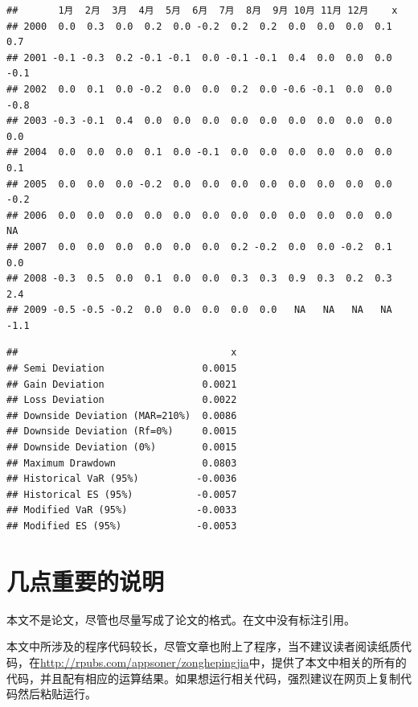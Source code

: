 \documentclass{article}\usepackage[]{graphicx}\usepackage[]{color}
\makeatletter
\newenvironment{kframe}{%
 \def\at@end@of@kframe{}%
 \ifinner\ifhmode%
  \def\at@end@of@kframe{\end{minipage}}%
  \begin{minipage}{\columnwidth}%
 \fi\fi%
 \def\FrameCommand##1{\hskip\@totalleftmargin \hskip-\fboxsep
 \colorbox{shadecolor}{##1}\hskip-\fboxsep
     \hskip-\linewidth \hskip-\@totalleftmargin \hskip\columnwidth}%
 \MakeFramed {\advance\hsize-\width
   \@totalleftmargin\z@ \linewidth\hsize
   \@setminipage}}%
 {\par\unskip\endMakeFramed%
 \at@end@of@kframe}
\newenvironment{knitrout}{}{} %
\makeatother
\begin{document}
\begin{CJK*}{UTF8}{gkai}
\begin{knitrout}
\end{knitrout}
\begin{knitrout}
\color{fgcolor}\begin{kframe}
\begin{verbatim}
##       1月  2月  3月  4月  5月  6月  7月  8月  9月 10月 11月 12月    x
## 2000  0.0  0.3  0.0  0.2  0.0 -0.2  0.2  0.2  0.0  0.0  0.0  0.1  0.7
## 2001 -0.1 -0.3  0.2 -0.1 -0.1  0.0 -0.1 -0.1  0.4  0.0  0.0  0.0 -0.1
## 2002  0.0  0.1  0.0 -0.2  0.0  0.0  0.2  0.0 -0.6 -0.1  0.0  0.0 -0.8
## 2003 -0.3 -0.1  0.4  0.0  0.0  0.0  0.0  0.0  0.0  0.0  0.0  0.0  0.0
## 2004  0.0  0.0  0.0  0.1  0.0 -0.1  0.0  0.0  0.0  0.0  0.0  0.0  0.1
## 2005  0.0  0.0  0.0 -0.2  0.0  0.0  0.0  0.0  0.0  0.0  0.0  0.0 -0.2
## 2006  0.0  0.0  0.0  0.0  0.0  0.0  0.0  0.0  0.0  0.0  0.0  0.0   NA
## 2007  0.0  0.0  0.0  0.0  0.0  0.0  0.2 -0.2  0.0  0.0 -0.2  0.1  0.0
## 2008 -0.3  0.5  0.0  0.1  0.0  0.0  0.3  0.3  0.9  0.3  0.2  0.3  2.4
## 2009 -0.5 -0.5 -0.2  0.0  0.0  0.0  0.0  0.0   NA   NA   NA   NA -1.1
\end{verbatim}
\end{kframe}
\end{knitrout}
\begin{knitrout}
\color{fgcolor}\begin{kframe}
\begin{verbatim}
##                                     x
## Semi Deviation                 0.0015
## Gain Deviation                 0.0021
## Loss Deviation                 0.0022
## Downside Deviation (MAR=210%)  0.0086
## Downside Deviation (Rf=0%)     0.0015
## Downside Deviation (0%)        0.0015
## Maximum Drawdown               0.0803
## Historical VaR (95%)          -0.0036
## Historical ES (95%)           -0.0057
## Modified VaR (95%)            -0.0033
## Modified ES (95%)             -0.0053
\end{verbatim}
\end{kframe}
\end{knitrout}
\section{几点重要的说明}

\textbullet 本文不是论文，尽管也尽量写成了论文的格式。在文中没有标注引用。

\textbullet 本文中所涉及的程序代码较长，尽管文章也附上了程序，当不建议读者阅读纸质代码，在\url{http://rpubs.com/appsoner/zonghepingjia}中，提供了本文中相关的所有的代码，并且配有相应的运算结果。如果想运行相关代码，强烈建议在网页上复制代码然后粘贴运行。


\end{CJK*}
\end{document}
